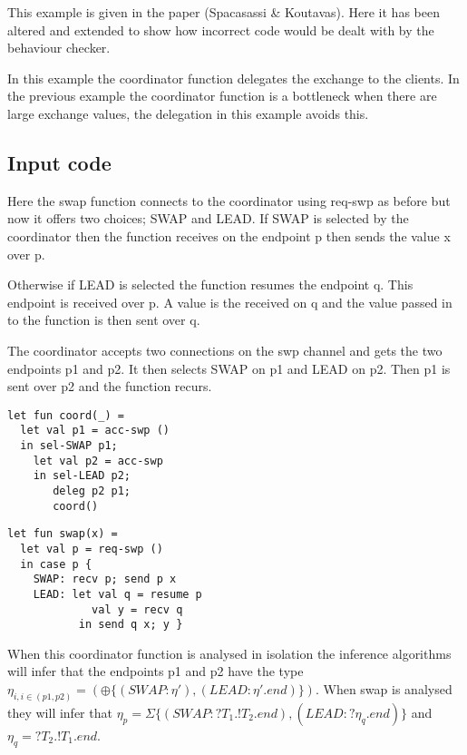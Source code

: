 This example is given in the paper (Spacasassi \& Koutavas)\cite{paper1}. Here it has been altered and extended to show how incorrect code would be dealt with by the behaviour checker. 

In this example the coordinator function delegates the exchange to the clients. In the previous example the coordinator function is a bottleneck when there are large exchange values, the delegation in this example avoids this. 

\subsection{Input code}

Here the swap function connects to the coordinator using req-swp as before but now it offers two choices; SWAP and LEAD. If SWAP is selected by the coordinator then the function receives on the endpoint p then sends the value x over p. 

Otherwise if LEAD is selected the function resumes the endpoint q. This endpoint is received over p. A value is the received on q and the value passed in to the function is then sent over q. 

The coordinator accepts two connections on the swp channel and gets the two endpoints p1 and p2. It then selects SWAP on p1 and LEAD on p2. Then p1 is sent over p2 and the function recurs. 

\begin{minipage}{.45\textwidth}
\begin{lstlisting}[backgroundcolor=\color{white},numbers=none]
let fun coord(_) =
  let val p1 = acc-swp ()
  in sel-SWAP p1;
    let val p2 = acc-swp
    in sel-LEAD p2;
       deleg p2 p1;
       coord()
\end{lstlisting}
\end{minipage}
\hfill
\begin{minipage}{.45\textwidth}
\begin{lstlisting}[backgroundcolor=\color{white},numbers=none]
let fun swap(x) =
  let val p = req-swp ()
  in case p {
    SWAP: recv p; send p x
    LEAD: let val q = resume p
             val y = recv q
           in send q x; y }
\end{lstlisting}
\end{minipage}

When this coordinator function is analysed in isolation the inference algorithms will infer that the endpoints p1 and p2 have the type $\eta_{i, i \in (p1,p2)} = (\oplus \{(SWAP : \eta'), (LEAD : \eta'. end) \})$. When swap is analysed they will infer that $\eta_p = \Sigma\{(SWAP : ?T_1 .!T_2. end), (LEAD : ? \eta_q . end)\}$ and $\eta_q = ?T_2.!T_1.end$. 

